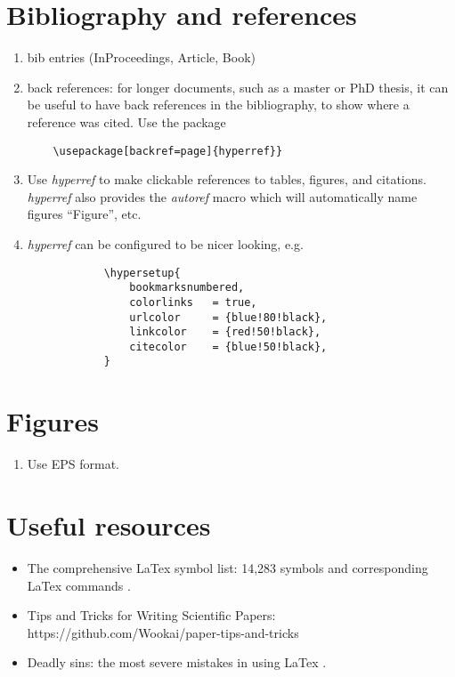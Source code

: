 \documentclass{article}
\begin{document}
\section{Bibliography and references}
\begin{enumerate}
    \item bib entries (InProceedings, Article, Book)
    \item back references: for longer documents, such as a master or PhD thesis, it can be useful to have back references in the bibliography, to show where a reference was cited. Use the package 
    \begin{lstlisting}
    \usepackage[backref=page]{hyperref}}
    \end{lstlisting}
    \item Use \textit{hyperref} to make clickable references to tables, figures, and citations. \textit{hyperref} also provides the \textit{autoref} macro which will automatically name figures ``Figure'', etc.
    \item \textit{hyperref} can be configured to be nicer looking, e.g.
        \begin{lstlisting}
            \hypersetup{
                bookmarksnumbered,
                colorlinks   = true,
                urlcolor     = {blue!80!black},
                linkcolor    = {red!50!black},
                citecolor    = {blue!50!black},
            }
        \end{lstlisting}
\end{enumerate}
\section{Figures}

\begin{enumerate}
    \item Use EPS format. 
\end{enumerate}{}

\section{Useful resources}

\begin{itemize}
    \item The comprehensive LaTex symbol list: 14,283 symbols and corresponding LaTex commands \cite{SymbolList}. 
    \item Tips and Tricks for Writing Scientific Papers: https://github.com/Wookai/paper-tips-and-tricks
    \item Deadly sins: the most severe mistakes in using LaTex \cite{Obsolete}.
\end{itemize}{}

\printbibliography
\end{document}
